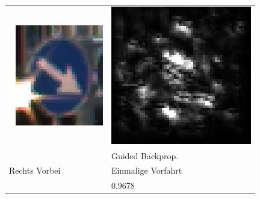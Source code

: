 \begin{table}
	\centering
	\begin{tabular}{p{4.5cm}p{4.5cm}}
		\includegraphics[height=4.4cm]{Images/AnPe/11240} &\includegraphics[width=\linewidth]{Images/AnPe/11240_guided}  \\
		& Guided Backprop.\\
		Rechts Vorbei & Einmalige Vorfahrt\\
		& 0.9678\\

\end{tabular}
\end{table}

